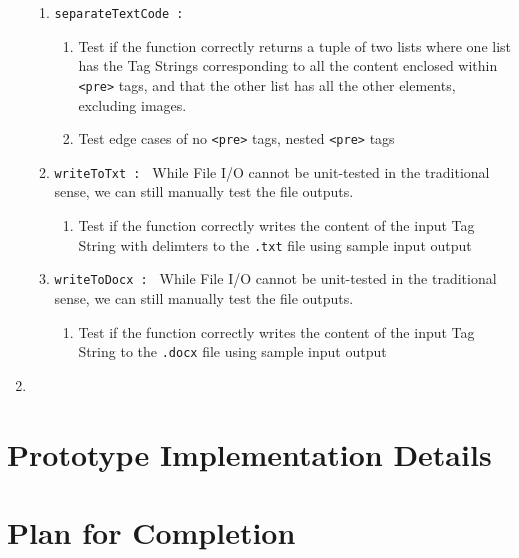 \documentclass{scrreprt}
\begin{document}
\begin{enumerate}
\begin{enumerate}
        \item \texttt{separateTextCode : }
        \begin{enumerate}
            \item Test if the function correctly returns a tuple of two lists where one list has the Tag Strings corresponding to all the content enclosed within \texttt{<pre>} tags, and that the other list has all the other elements, excluding images.
            \item Test edge cases of no \texttt{<pre>} tags, nested \texttt{<pre>} tags
        \end{enumerate}

        \item \texttt{writeToTxt : }
        While File I/O cannot be unit-tested in the traditional sense, we can still manually test the file outputs.
        \begin{enumerate}
            \item Test if the function correctly writes the content of the input Tag String with delimters to the \texttt{.txt} file using sample input output
        \end{enumerate}

        \item \texttt{writeToDocx : }
        While File I/O cannot be unit-tested in the traditional sense, we can still manually test the file outputs.
        \begin{enumerate}
            \item Test if the function correctly writes the content of the input Tag String to the \texttt{.docx} file using sample input output
        \end{enumerate}




    \end{enumerate}
    \item 
\end{enumerate}






\chapter{Prototype Implementation Details}




\chapter{Plan for Completion}
\end{document}
